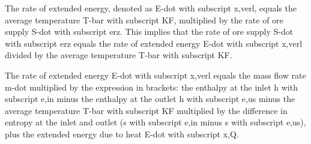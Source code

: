 The rate of extended energy, denoted as E-dot with subscript x,verl, equals the average temperature T-bar with subscript KF, multiplied by the rate of ore supply S-dot with subscript erz. This implies that the rate of ore supply S-dot with subscript erz equals the rate of extended energy E-dot with subscript x,verl divided by the average temperature T-bar with subscript KF.

The rate of extended energy E-dot with subscript x,verl equals the mass flow rate m-dot multiplied by the expression in brackets: the enthalpy at the inlet h with subscript e,in minus the enthalpy at the outlet h with subscript e,us minus the average temperature T-bar with subscript KF multiplied by the difference in entropy at the inlet and outlet (s with subscript e,in minus s with subscript e,us), plus the extended energy due to heat E-dot with subscript x,Q.